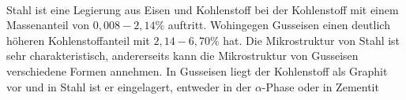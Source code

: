 \documentclass[11pt,a4paper]{article}
\numberwithin{equation}{section}
\numberwithin{figure}{section}
\begin{document}
\\
\begin{addmargin}[25pt]{0pt}
Stahl ist eine Legierung aus Eisen und Kohlenstoff bei der Kohlenstoff mit einem Massenanteil von $0,008-2,14 \%$ auftritt. Wohingegen Gusseisen einen deutlich höheren Kohlenstoffanteil mit $2,14-6,70 \%$ hat. Die Mikrostruktur von Stahl ist sehr charakteristisch, andererseits kann die Mikrostruktur von Gusseisen verschiedene Formen annehmen. In Gusseisen liegt der Kohlenstoff als Graphit vor und in Stahl ist er eingelagert, entweder in der $\alpha$-Phase oder in Zementit  \\
\end{addmargin}
\end{document}
